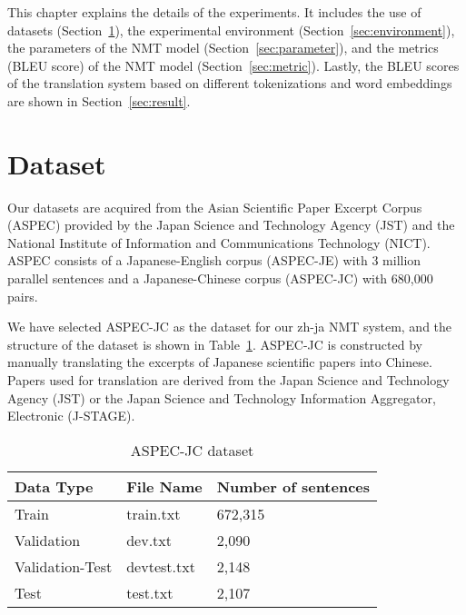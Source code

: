 \hspace{24pt}

This chapter explains the details of the experiments. It includes the use of datasets (Section~\ref{sec:dataset}), the experimental environment (Section~\ref{sec:environment}), the parameters of the NMT model (Section~\ref{sec:parameter}), and the metrics (BLEU score) of the NMT model (Section~\ref{sec:metric}). Lastly, the BLEU scores of the translation system based on different tokenizations and word embeddings are shown in Section~\ref{sec:result}.

\section{Dataset} \label{sec:dataset}

Our datasets are acquired from the Asian Scientific Paper Excerpt Corpus (ASPEC) \cite{nakazawa-etal-2016-aspec} provided by the Japan Science and Technology Agency (JST) and the National Institute of Information and Communications Technology (NICT). ASPEC consists of a Japanese-English corpus (ASPEC-JE) with 3 million parallel sentences and a Japanese-Chinese corpus (ASPEC-JC) with 680,000 pairs.

We have selected ASPEC-JC as the dataset for our zh-ja NMT system, and the structure of the dataset is shown in Table~\ref{tab:aspec-jc}. ASPEC-JC is constructed by manually translating the excerpts of Japanese scientific papers into Chinese. Papers used for translation are derived from the Japan Science and Technology Agency (JST) or the Japan Science and Technology Information Aggregator, Electronic (​J-STAGE).

\vspace{0.4cm}
\begin{table}[h]
    \centering
    \begin{tabularx}{0.7\textwidth}{bbb}\toprule
        Data Type & File Name & Number of sentences \\\midrule
        Train & train.txt & 672,315 \\
        Validation & dev.txt & 2,090 \\
        Validation-Test & devtest.txt & 2,148 \\
        Test & test.txt & 2,107 \\
        \bottomrule
    \end{tabularx}
    \caption{ASPEC-JC dataset}
    \label{tab:aspec-jc}
\end{table}

